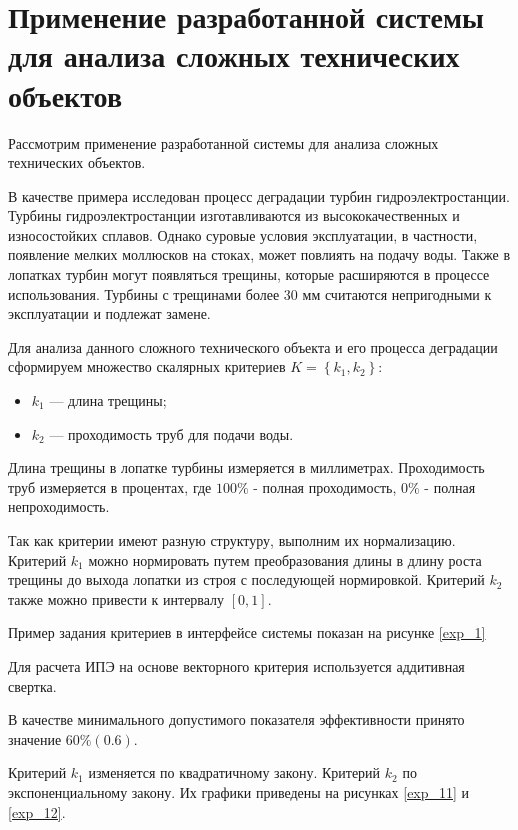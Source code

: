 \section{Применение разработанной системы для анализа сложных технических объектов}

Рассмотрим применение разработанной системы для анализа сложных технических объектов.

В качестве примера исследован процесс деградации турбин гидроэлектростанции.
Турбины гидроэлектростанции изготавливаются из высококачественных и износостойких сплавов.
Однако суровые условия эксплуатации, в частности, появление мелких моллюсков на стоках, может повлиять на подачу воды.
Также в лопатках турбин могут появляться трещины, которые расширяются в процессе использования.
Турбины с трещинами более 30 мм считаются непригодными к эксплуатации и подлежат замене.

Для анализа данного сложного технического объекта и его процесса деградации сформируем множество скалярных критериев $K=\left\{k_1,k_2\right\}$:
\begin{itemize}
    \item $k_1$ --- длина трещины;
    \item $k_2$ --- проходимость труб для подачи воды.
\end{itemize}

Длина трещины в лопатке турбины измеряется в миллиметрах.
Проходимость труб измеряется в процентах, где $100\%$ - полная проходимость, $0\%$ - полная непроходимость.

Так как критерии имеют разную структуру, выполним их нормализацию. 
Критерий $k_1$ можно нормировать путем преобразования длины в длину роста трещины до выхода лопатки из строя с последующей нормировкой.
Критерий $k_2$ также можно привести к интервалу $[0,1]$.

Пример задания критериев в интерфейсе системы показан на рисунке \ref{exp_1}


Для расчета ИПЭ на основе векторного критерия используется аддитивная свертка.

В качестве минимального допустимого показателя эффективности принято значение $60\% (0.6)$.

Критерий $k_1$ изменяется по квадратичному закону. Критерий $k_2$ по экспоненциальному закону. 
Их графики приведены на рисунках \ref{exp_11} и \ref{exp_12}.


